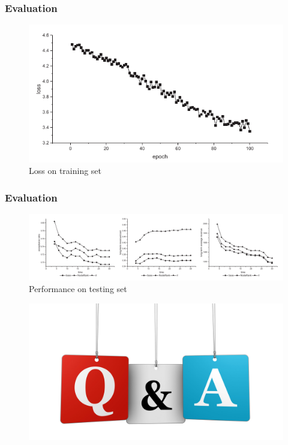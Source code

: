 \documentclass{beamer}
\begin{document}
\begin{frame}
	\frametitle{Evaluation}
	
\begin{figure}
	\centering
	\includegraphics[width=0.9\linewidth]{../Images/fig2}
	\caption{Loss on training set}
	\label{fig:fig2}
\end{figure}
\end{frame}
\begin{frame}
	\frametitle{Evaluation}
\begin{figure}
	\centering
	\includegraphics[scale=0.34]{../Images/fig3}
	\caption{Performance on testing set}
	\label{fig:fig3}
\end{figure}	
\end{frame}
\begin{frame}
\begin{figure}
	\centering
	\includegraphics[width=0.8\linewidth]{../Images/Q&A}
	\label{fig:qa}
\end{figure}
	
\end{frame}
\end{document}
